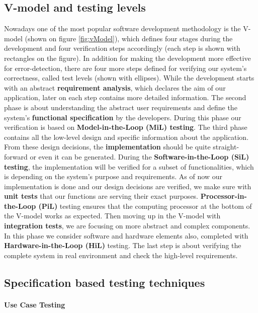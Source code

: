 \subsection{V-model and testing levels}
Nowadays one of the most popular software development methodology is the V-model \cite{Vmodel} (shown on figure \ref{fig:vModel}), which defines four stages during the development and four verification steps accordingly (each step is shown with rectangles on the figure). In addition for making the development more effective for error-detection, there are four more steps defined for verifying our system's correctness, called test levels \cite{TestLevels} (shown with ellipses). While the development starts with an abstract \textbf{requirement analysis}, which declares the aim of our application, later on each step contains more detailed information. The second phase is about understanding the abstract user requirements and define the system's \textbf{functional specification} by the developers. During this phase our verification is based on \textbf{Model-in-the-Loop (MiL) testing}. The third phase contains all the low-level design and specific information about the application. From these design decisions, the \textbf{implementation} should be quite straight-forward or even it can be generated. During the \textbf{Software-in-the-Loop (SiL) testing}, the implementation will be verified for a subset of functionalities, which is depending on the system's purpose and requirements.
As of now our implementation is done and our design decisions are verified, we make sure with \textbf{unit tests} that our functions are serving their exact purposes. \textbf{Processor-in-the-Loop (PiL)} testing ensures that the computing processor at the bottom of the V-model works as expected. Then moving up in the V-model with \textbf{integration tests}, we are focusing on more abstract and complex components. In this phase we consider software and hardware elements also, completed with \textbf{Hardware-in-the-Loop (HiL)} testing. The last step is about verifying the complete system in real environment and check the high-level requirements.

\subsection{Specification based testing techniques}
\paragraph{Use Case Testing}
